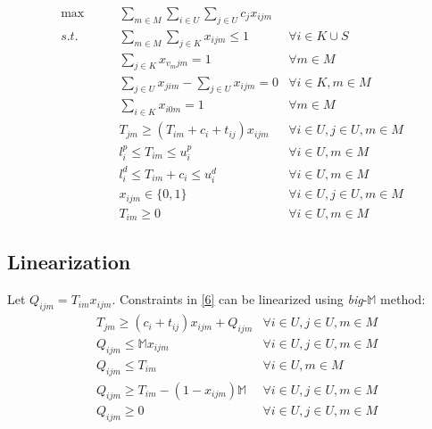 \documentclass[a4paper]{article}
\begin{document}
\begin{align}
 \max\qquad & \sum_{m\in M}\sum_{i\in U}\sum_{j\in U} c_j x_{ijm} \label{obj}                                            \\
 s.t.\qquad & \sum_{m\in M}\sum_{j\in K} x_{ijm} \leqslant 1                  & \forall i \in K\cup S  \label{2}         \\
            & \sum_{j \in K} x_{v_{m}jm} = 1                                  & \forall m\in M \label{3}                 \\
            & \sum_{j \in U} x_{jim} - \sum_{j \in U} x_{ijm}=0               & \forall i \in
 K, m\in M \label{4}                                                                                                     \\
            & \sum_{i\in K} x_{i0m} = 1                                       & \forall m\in M \label{5}                 \\
            & T_{jm} \geqslant (T_{im}+c_i+t_{ij})x_{ijm}                     & \forall i\in U, j\in U,m\in M \label{6}  \\
            & l_i^p \leqslant T_{im} \leqslant u_i^p                          & \forall i \in U,m\in M \label{7}         \\
            & l_i^d \leqslant T_{im}+c_i \leqslant u_i^d                      & \forall i \in U,m\in M \label{8}         \\
            & x_{ijm}\in \{0,1\}                                              & \forall i\in U, j\in U, m\in M \label{9} \\
            & T_{im} \geqslant 0                                              & \forall i\in U, m\in M \label{10}
\end{align}

\subsection{Linearization}

Let $Q_{ijm} = T_{im}x_{ijm}$. Constraints in \eqref{6} can be linearized using \textit{big}-$\mathbb{M}$ method:\\
\begin{align}
  & T_{jm} \geqslant (c_i+t_{ij})x_{ijm}+Q_{ijm} &\forall i\in U, j\in U,m\in M \label{11}\\
  & Q_{ijm} \leqslant \mathbb{M} x_{ijm} &\forall i\in U, j\in U,m\in M \label{12}\\
  & Q_{ijm} \leqslant T_{im} &\forall i\in U,m\in M \label{13}\\
  & Q_{ijm} \geqslant T_{im} - (1-x_{ijm})\mathbb{M} &\forall i\in U, j\in U,m\in M \label{14}\\
  & Q_{ijm} \geqslant 0 &\forall i\in U, j\in U,m\in M \label{15}
\end{align}
\end{document}
